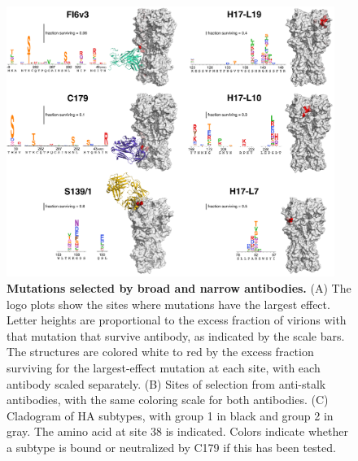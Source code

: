 \documentclass[11pt]{article}
\begin{document}
\begin{figure}
\centerline{\includegraphics[width=0.95\textwidth]{figs/logoplots_pymol/logoplots_pymol.pdf}}
\caption{
\label{fig:structures}
{\bf Mutations selected by broad and narrow antibodies.}
(A) The logo plots show the sites where mutations have the largest effect.
Letter heights are proportional to the excess fraction of virions with that mutation that survive antibody, as indicated by the scale bars.
The structures are colored white to red by the excess fraction surviving for the largest-effect mutation at each site, with each antibody scaled separately.  
(B) Sites of selection from anti-stalk antibodies, with the same coloring scale for both antibodies.
(C) Cladogram of HA subtypes, with group 1 in black and group 2 in gray. 
The amino acid at site 38 is indicated. 
Colors indicate whether a subtype is bound or neutralized by C179 if this has been tested.  
}
\end{figure}
\end{document}
